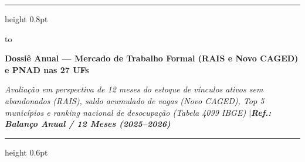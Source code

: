 \documentclass[10pt,a4paper]{article}
\begin{document}
\color{cinzatexto}

%
\par\vspace{2pt}%
{\color{coracento}\hrule height 0.8pt}%
\par\vspace{6pt}%
\noindent\hbox to %
\par\vspace{5pt}%
{\fontsize{14.5}{17.4}\selectfont\bfseries\color{corprimaria}Dossiê Anual — Mercado de Trabalho Formal (RAIS e Novo CAGED) e PNAD nas 27 UFs\par}%
\vspace{3pt}%
{\footnotesize\itshape\color{cinzasub}Avaliação em perspectiva de 12 meses do estoque de vínculos ativos sem abandonados (RAIS), saldo acumulado de vagas (Novo CAGED), Top 5 municípios e ranking nacional de desocupação (Tabela 4099 IBGE) \enspace$\vert$\enspace \textbf{\color{corprimaria}Ref.: Balanço Anual / 12 Meses (2025–2026)}\par}%
\par\vspace{6pt}%
{\color{cinzaborda}\hrule height 0.6pt}%

\vspace{0.12cm}
\end{document}
